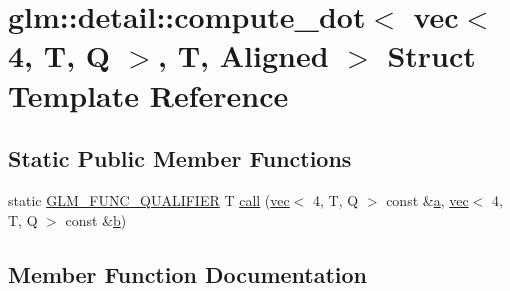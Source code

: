 \hypertarget{structglm_1_1detail_1_1compute__dot_3_01vec_3_014_00_01_t_00_01_q_01_4_00_01_t_00_01_aligned_01_4}{}\section{glm\+:\+:detail\+:\+:compute\+\_\+dot$<$ vec$<$ 4, T, Q $>$, T, Aligned $>$ Struct Template Reference}
\label{structglm_1_1detail_1_1compute__dot_3_01vec_3_014_00_01_t_00_01_q_01_4_00_01_t_00_01_aligned_01_4}
\subsection*{Static Public Member Functions}
\begin{DoxyCompactItemize}
\item 
static \mbox{\hyperlink{setup_8hpp_a33fdea6f91c5f834105f7415e2a64407}{G\+L\+M\+\_\+\+F\+U\+N\+C\+\_\+\+Q\+U\+A\+L\+I\+F\+I\+ER}} T \mbox{\hyperlink{structglm_1_1detail_1_1compute__dot_3_01vec_3_014_00_01_t_00_01_q_01_4_00_01_t_00_01_aligned_01_4_a960387a4cb95a1a796219b05f263d021}{call}} (\mbox{\hyperlink{structglm_1_1vec}{vec}}$<$ 4, T, Q $>$ const \&\mbox{\hyperlink{_s_d_l__opengl__glext_8h_a3309789fc188587d666cda5ece79cf82}{a}}, \mbox{\hyperlink{structglm_1_1vec}{vec}}$<$ 4, T, Q $>$ const \&\mbox{\hyperlink{_s_d_l__opengl__glext_8h_a0f71581a41fd2264c8944126dabbd010}{b}})
\end{DoxyCompactItemize}


\subsection{Member Function Documentation}
\mbox{\label{structglm_1_1detail_1_1compute__dot_3_01vec_3_014_00_01_t_00_01_q_01_4_00_01_t_00_01_aligned_01_4_a960387a4cb95a1a796219b05f263d021}} 
